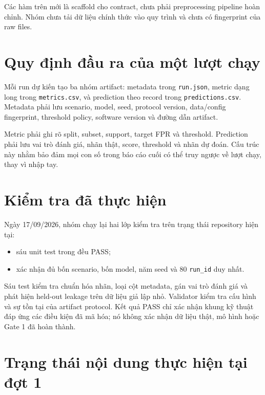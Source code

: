 \documentclass[12pt,a4paper,oneside]{report}
\begin{document}
Các hàm trên mới là scaffold cho contract, chưa phải preprocessing pipeline hoàn chỉnh. Nhóm chưa tải dữ liệu chính thức vào quy trình và chưa có fingerprint của raw files.

\section{Quy định đầu ra của một lượt chạy}

Mỗi run dự kiến tạo ba nhóm artifact: metadata trong \texttt{run.json}, metric dạng long trong \texttt{metrics.csv}, và prediction theo record trong \texttt{predictions.csv}. Metadata phải lưu scenario, model, seed, protocol version, data/config fingerprint, threshold policy, software version và đường dẫn artifact.

Metric phải ghi rõ split, subset, support, target FPR và threshold. Prediction phải lưu vai trò đánh giá, nhãn thật, score, threshold và nhãn dự đoán. Cấu trúc này nhằm bảo đảm mọi con số trong báo cáo cuối có thể truy ngược về lượt chạy, thay vì nhập tay.

\section{Kiểm tra đã thực hiện}

Ngày 17/09/2026, nhóm chạy lại hai lớp kiểm tra trên trạng thái repository hiện tại:
\begin{itemize}[leftmargin=1.05cm,itemsep=0.15em]
  \item sáu unit test trong  đều PASS;
  \item {} xác nhận đủ bốn scenario, bốn model, năm seed và 80 \texttt{run\_id} duy nhất.
\end{itemize}

Sáu test kiểm tra chuẩn hóa nhãn, loại cột metadata, gán vai trò đánh giá và phát hiện held-out leakage trên dữ liệu giả lập nhỏ. Validator kiểm tra cấu hình và sự tồn tại của artifact protocol. Kết quả PASS chỉ xác nhận khung kỹ thuật đáp ứng các điều kiện đã mã hóa; nó không xác nhận dữ liệu thật, mô hình hoặc Gate 1 đã hoàn thành.

\section{Trạng thái nội dung thực hiện tại đợt 1}
\end{document}
